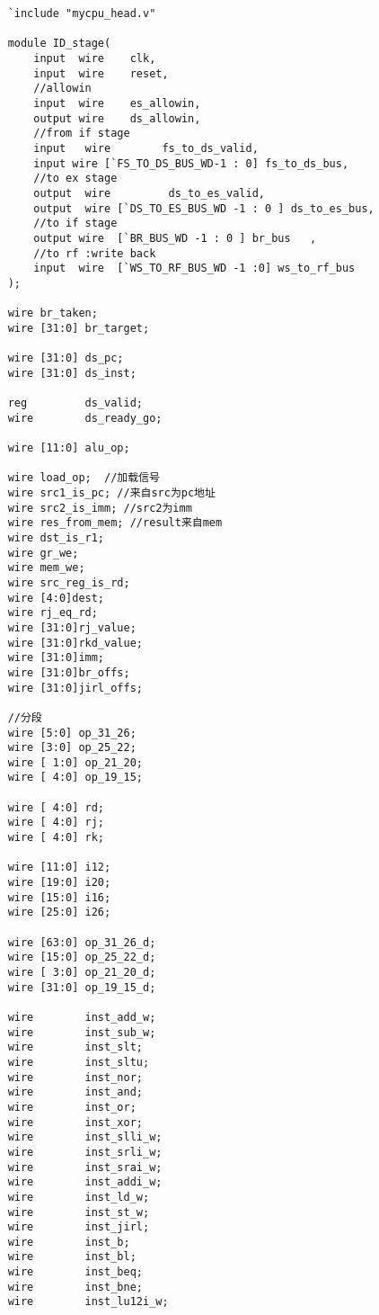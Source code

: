 \begin{lstlisting}
    `include "mycpu_head.v"

    module ID_stage(
        input  wire    clk,
        input  wire    reset,
        //allowin
        input  wire    es_allowin,
        output wire    ds_allowin,
        //from if stage
        input   wire        fs_to_ds_valid,
        input wire [`FS_TO_DS_BUS_WD-1 : 0] fs_to_ds_bus,
        //to ex stage
        output  wire         ds_to_es_valid,
        output  wire [`DS_TO_ES_BUS_WD -1 : 0 ] ds_to_es_bus,
        //to if stage
        output wire  [`BR_BUS_WD -1 : 0 ] br_bus   ,
        //to rf :write back
        input  wire  [`WS_TO_RF_BUS_WD -1 :0] ws_to_rf_bus
    );

    wire br_taken;
    wire [31:0] br_target;

    wire [31:0] ds_pc;
    wire [31:0] ds_inst;

    reg         ds_valid;
    wire        ds_ready_go;

    wire [11:0] alu_op;

    wire load_op;  //加载信号
    wire src1_is_pc; //来自src为pc地址
    wire src2_is_imm; //src2为imm
    wire res_from_mem; //result来自mem
    wire dst_is_r1;
    wire gr_we; 
    wire mem_we; 
    wire src_reg_is_rd;
    wire [4:0]dest;
    wire rj_eq_rd;
    wire [31:0]rj_value;
    wire [31:0]rkd_value;
    wire [31:0]imm;
    wire [31:0]br_offs;
    wire [31:0]jirl_offs;

    //分段
    wire [5:0] op_31_26;
    wire [3:0] op_25_22;
    wire [ 1:0] op_21_20;
    wire [ 4:0] op_19_15;

    wire [ 4:0] rd;
    wire [ 4:0] rj;
    wire [ 4:0] rk;

    wire [11:0] i12;
    wire [19:0] i20;
    wire [15:0] i16;
    wire [25:0] i26;

    wire [63:0] op_31_26_d;
    wire [15:0] op_25_22_d;
    wire [ 3:0] op_21_20_d;
    wire [31:0] op_19_15_d;

    wire        inst_add_w;
    wire        inst_sub_w;
    wire        inst_slt;
    wire        inst_sltu;
    wire        inst_nor;
    wire        inst_and;
    wire        inst_or;
    wire        inst_xor;
    wire        inst_slli_w;
    wire        inst_srli_w;
    wire        inst_srai_w;
    wire        inst_addi_w;
    wire        inst_ld_w;
    wire        inst_st_w;
    wire        inst_jirl;
    wire        inst_b;
    wire        inst_bl;
    wire        inst_beq;
    wire        inst_bne;
    wire        inst_lu12i_w;


\end{lstlisting}
